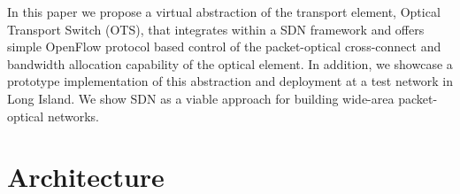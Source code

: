 \documentclass{sig-alternate-10pt}
\begin{document}
	In this paper we propose a virtual abstraction of the transport element, Optical Transport Switch (OTS), that integrates within a SDN framework and
	offers simple OpenFlow protocol based control of the packet-optical cross-connect and bandwidth allocation capability of the optical element. In addition,
	we showcase a prototype implementation of this abstraction and deployment at a test network in Long Island. We show SDN as a
	viable approach for building wide-area packet-optical networks. 
	
			 
			
	 
		

\section{Architecture}
\label{sec:arch}
		
\end{document}
